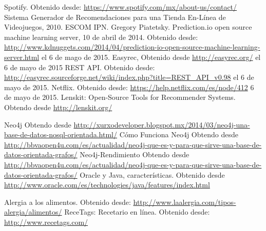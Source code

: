 \begin{thebibliography}{1}
     Spotify. Obtenido desde: \url{https://www.spotify.com/mx/about-us/contact/}
     Sistema Generador de Recomendaciones para una Tienda En-Línea de Videojuegos, 2010. ESCOM IPN. 
    Gregory Piatetsky. Prediction.io open source machine learning server, 10 de abril de 2014. Obtenido desde: \url{http://www.kdnuggets.com/2014/04/prediction-io-open-source-machine-learning-server.html} el 6 de mago de 2015. 
    Easyrec, Obtenido desde \url{http://easyrec.org/} el 6 de mayo de 2015 
    REST API. Obtenido desde: \url{http://easyrec.sourceforge.net/wiki/index.php?title=REST_API_v0.98} el 6 de mayo de 2015. 
    Netflix. Obtenido desde: \url{https://help.netflix.com/es/node/412} 6 de mayo de 2015.
    Lenskit: Open-Source Tools for Recommender Systems. Obtendo desde \url{http://lenskit.org/}

    Neo4j Obtendo desde \url{http://xurxodeveloper.blogspot.mx/2014/03/neo4j-una-base-de-datos-nosql-orientada.html/}
    Cómo Funciona Neo4j Obtendo desde \url{http://bbvaopen4u.com/es/actualidad/neo4j-que-es-y-para-que-sirve-una-base-de-datos-orientada-grafos/}
    Neo4j-Rendimiento Obtendo desde \url{http://bbvaopen4u.com/es/actualidad/neo4j-que-es-y-para-que-sirve-una-base-de-datos-orientada-grafos/}	
    Oracle y Java, características. Obtenido desde \url{http://www.oracle.com/es/technologies/java/features/index.html}

      Alergia a los alimentos. Obtenido desde: \url{http://www.laalergia.com/tipos-alergia/alimentos/}
      ReceTags: Recetario en línea. Obtenido desde: \url{http://www.recetags.com/}

\end{thebibliography}
